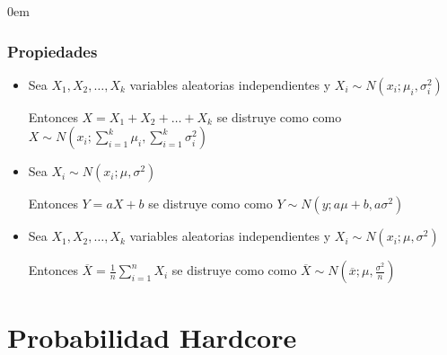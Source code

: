 \documentclass[12pt, fleqn]{report}                             %
\newenvironment{SmallIndentation}[1][0.75em]                    %
        {\begin{adjustwidth}{#1}{}\begin{footnotesize}}             %
        {\end{footnotesize}\end{adjustwidth}}                       %
\newcommand \Over               {\overline}                     %
\theoremstyle{break}                                            %
\begin{document}
\begin{multicols}{2}
\begin{SmallIndentation}[0em]
                    \subsubsection{Propiedades}

                        \begin{itemize}

                            \item 
                                Sea $X_1, X_2, \dots, X_k$ variables aleatorias independientes
                                y $X_i \sim N(x_i; \mu_i, \sigma_i^2)$  

                                Entonces $X = X_1 + X_2 + \dots + X_k$ se distruye como
                                como $X \sim N(x_i; \sum_{i=1}^k \mu_i, \sum_{i=1}^k \sigma_i^2)$

                            \item 
                                Sea $X_i \sim N(x_i; \mu, \sigma^2)$  

                                Entonces $Y = aX + b$ se distruye como
                                como $Y \sim N(y; a\mu + b, a\sigma^2)$

                            \item 
                                Sea $X_1, X_2, \dots, X_k$ variables aleatorias independientes
                                y $X_i \sim N(x_i; \mu, \sigma^2)$  

                                Entonces $\Over{X} = \frac{1}{n} \sum_{i=1}^n X_i$ se distruye como
                                como $\Over{X} \sim N(\Over{x}; \mu, \frac{\sigma^2}{n})$

                        \end{itemize}
                    

                \end{SmallIndentation}
                \end{multicols}



        \clearpage
        \section{Probabilidad Hardcore}
\end{document}
